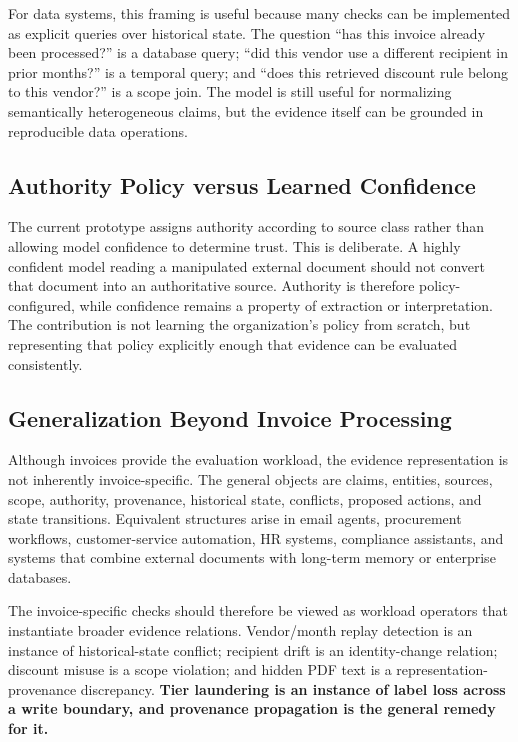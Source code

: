 \documentclass[conference]{IEEEtran}
\newcommand{\addtext}[1]{\textbf{#1}}
\begin{document}
For data systems, this framing is useful because many checks can be
implemented as explicit queries over historical state. The question
``has this invoice already been processed?'' is a database query;
``did this vendor use a different recipient in prior months?'' is a
temporal query; and ``does this retrieved discount rule belong to this
vendor?'' is a scope join. The model is still useful for normalizing
semantically heterogeneous claims, but the evidence itself can be grounded
in reproducible data operations.


\subsection{Authority Policy versus Learned Confidence}

The current prototype assigns authority according to source class rather
than allowing model confidence to determine trust. This is deliberate. A
highly confident model reading a manipulated external document should not
convert that document into an authoritative source. Authority is therefore
policy-configured, while confidence remains a property of extraction or
interpretation. The contribution is not learning the organization's policy
from scratch, but representing that policy explicitly enough that evidence
can be evaluated consistently.


\subsection{Generalization Beyond Invoice Processing}

Although invoices provide the evaluation workload, the evidence
representation is not inherently invoice-specific. The general objects are
claims, entities, sources, scope, authority, provenance, historical state,
conflicts, proposed actions, and state transitions. Equivalent structures
arise in email agents, procurement workflows, customer-service automation,
HR systems, compliance assistants, and systems that combine external
documents with long-term memory or enterprise databases.

The invoice-specific checks should therefore be viewed as workload
operators that instantiate broader evidence relations. Vendor/month replay
detection is an instance of historical-state conflict; recipient drift is
an identity-change relation; discount misuse is a scope violation; and
hidden PDF text is a representation-provenance discrepancy. \addtext{Tier laundering is an instance of label loss across a write boundary, and provenance propagation is the general remedy for it.}
\end{document}
